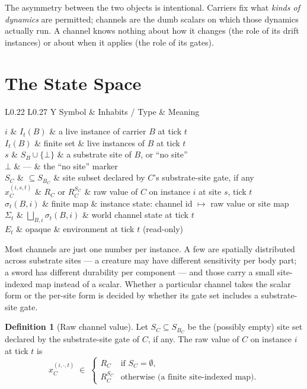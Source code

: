 \documentclass[journal,onecolumn,11pt]{IEEEtran}
\theoremstyle{definition}
\newtheorem{definition}{Definition}
\newcommand{\notationtable}[3]{%
  \begin{table}[ht]
  \centering
  \caption{#1}
  \label{#2}
  \small
  \renewcommand{\arraystretch}{1.1}
  \begin{tabularx}{\linewidth}{L{0.22\linewidth} L{0.27\linewidth} Y}
  \toprule
  Symbol & Inhabits / Type & Meaning \\
  \midrule
  #3
  \bottomrule
  \end{tabularx}
  \end{table}%
}
\begin{document}
The asymmetry between the two objects is intentional. Carriers fix what \emph{kinds of dynamics} are permitted; channels are the dumb scalars on which those dynamics actually run. A channel knows nothing about how it changes (the role of its drift instances) or about when it applies (the role of its gates).

\section{The State Space}
\label{sec:state}

\notationtable{Symbols introduced in \cref{sec:state}.}{tab:notation-state}{
$i$                       & $I_t(B)$                     & a live instance of carrier $B$ at tick $t$ \\
$I_t(B)$                  & finite set                   & live instances of $B$ at tick $t$ \\
$s$                       & $S_B \cup \{\bot\}$          & a substrate site of $B$, or ``no site'' \\
$\bot$                    & ---                          & the ``no site'' marker \\
$S_C$                     & $\subseteq S_{B_C}$          & site subset declared by $C$'s substrate-site gate, if any \\
$x_C^{(i,s,t)}$           & $R_C$ or $R_C^{S_C}$         & raw value of $C$ on instance $i$ at site $s$, tick $t$ \\
$\sigma_t(B,i)$           & finite map                   & instance state: channel id $\mapsto$ raw value or site map \\
$\Sigma_t$                & $\bigsqcup_{B,i}\sigma_t(B,i)$ & world channel state at tick $t$ \\
$E_t$                     & opaque                       & environment at tick $t$ (read-only) \\
}

Most channels are just one number per instance. A few are spatially distributed across substrate sites --- a creature may have different sensitivity per body part; a sword has different durability per component --- and those carry a small site-indexed map instead of a scalar. Whether a particular channel takes the scalar form or the per-site form is decided by whether its gate set includes a substrate-site gate.

\begin{definition}[Raw channel value]\label{def:raw}
Let $S_C \subseteq S_{B_C}$ be the (possibly empty) site set declared by the substrate-site gate of $C$, if any. The raw value of $C$ on instance $i$ at tick $t$ is
\[
x_C^{(i,\cdot,t)} \;\in\;
\begin{cases}
R_C & \text{if } S_C = \emptyset,\\
R_C^{S_C} & \text{otherwise (a finite site-indexed map).}
\end{cases}
\]
\end{definition}
\end{document}

